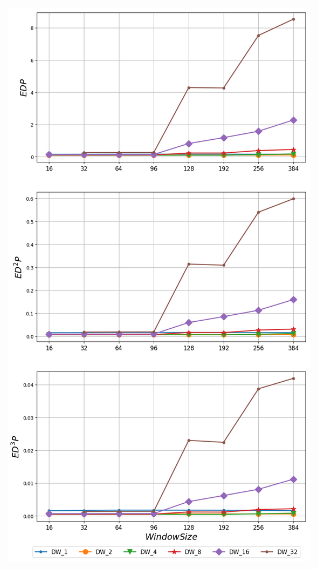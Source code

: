    \begin{minipage}{\textwidth}
      \begin{center}
         \\
         \vspace{3mm}
         \includegraphics[width=0.6\textwidth]{./graphs/edp/gcc.png}
         \vspace{6mm}
      \end{center}
   \end{minipage}

